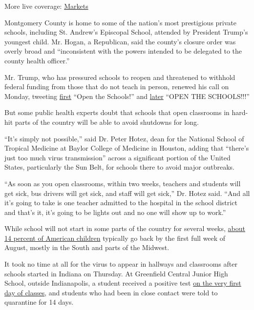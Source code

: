 More live coverage:
\href{https://www.nytimes3xbfgragh.onion/live/2020/08/03/business/stock-market-today-coronavirus?action=click\&pgtype=Article\&state=default\&region=MAIN_CONTENT_1\&context=storylines_live_updates}{Markets}

Montgomery County is home to some of the nation's most prestigious
private schools, including St. Andrew's Episcopal School, attended by
President Trump's youngest child. Mr. Hogan, a Republican, said the
county's closure order was overly broad and ``inconsistent with the
powers intended to be delegated to the county health officer.''

Mr. Trump, who has pressured schools to reopen and threatened to
withhold federal funding from those that do not teach in person, renewed
his call on Monday, tweeting
\href{https://twitter.com/realDonaldTrump/status/1290257055534551043}{first}
``Open the Schools!'' and
\href{https://twitter.com/realDonaldTrump/status/1290488364362170371}{later}
``OPEN THE SCHOOLS!!!''

But some public health experts doubt that schools that open classrooms
in hard-hit parts of the country will be able to avoid shutdowns for
long.

``It's simply not possible,'' said Dr. Peter Hotez, dean for the
National School of Tropical Medicine at Baylor College of Medicine in
Houston, adding that ``there's just too much virus transmission'' across
a significant portion of the United States, particularly the Sun Belt,
for schools there to avoid major outbreaks.

``As soon as you open classrooms, within two weeks, teachers and
students will get sick, bus drivers will get sick, and staff will get
sick,'' Dr. Hotez said. ``And all it's going to take is one teacher
admitted to the hospital in the school district and that's it, it's
going to be lights out and no one will show up to work.''

While school will not start in some parts of the country for several
weeks,
\href{https://www.pewresearch.org/fact-tank/2019/08/14/back-to-school-dates-u-s/}{about
14 percent of American children} typically go back by the first full
week of August, mostly in the South and parts of the Midwest.

It took no time at all for the virus to appear in hallways and
classrooms after schools started in Indiana on Thursday. At Greenfield
Central Junior High School, outside Indianapolis, a student received a
positive test
\href{https://www.nytimes3xbfgragh.onion/2020/08/01/us/schools-reopening-indiana-coronavirus.html}{on
the very first day of classes}, and students who had been in close
contact were told to quarantine for 14 days.

